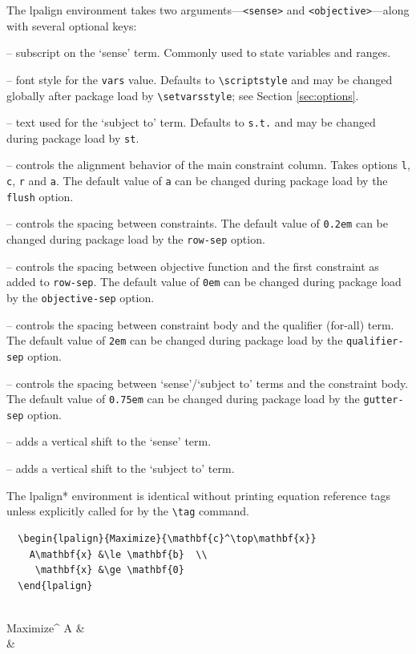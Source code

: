 \documentclass{article}
\begin{document}
The \textsf{lpalign} environment takes two arguments---\verb|<sense>| and \verb|<objective>|---along with several optional keys:\Vtrg
  \begin{compactitem}
  \item[\Verb|vars|] -- subscript on the `sense' term. Commonly used to state variables and ranges.
  \item[\Verb|vars-style|] -- font style for the \verb|vars| value. Defaults to \verb|\scriptstyle| and may be changed globally after package load by \verb|\setvarsstyle|; see Section \ref{sec:options}.
  \item[\Verb|st|] -- text used for the `subject to' term. Defaults to \verb|s.t.| and may be changed during package load by \verb|st|.
  \item[\Verb|flush|] -- controls the alignment behavior of the main constraint column. Takes options \verb|l|, \verb|c|, \verb|r| and \verb|a|. The default value of \verb|a| can be changed during package load by the \verb|flush| option.
  \item[\Verb|row-sep|] -- controls the spacing between constraints. The default value of \verb|0.2em| can be changed during package load by the \verb|row-sep| option.
  \item[\Verb|objective-sep|] -- controls the spacing between objective function and the first constraint as added to \verb|row-sep|. The default value of \verb|0em| can be changed during package load by the \verb|objective-sep| option.
  \item[\Verb|qualifier-sep|] -- controls the spacing between constraint body and the qualifier (for-all) term. The default value of \verb|2em| can be changed during package load by the \verb|qualifier-sep| option.
  \item[\Verb|gutter-sep|] -- controls the spacing between `sense'/`subject to' terms and the constraint body. The default value of \verb|0.75em| can be changed during package load by the \verb|gutter-sep| option.
  \item[\Verb|sense-shift|] -- adds a vertical shift to the `sense' term.
  \item[\Verb|st-shift|] -- adds a vertical shift to the `subject to' term.
  \end{compactitem}
The \textsf{lpalign*} environment is identical without printing equation reference tags unless explicitly called for by the \verb|\tag| command.
\begin{tcolorbox}
  \begin{Verbatim}
  \begin{lpalign}{Maximize}{\mathbf{c}^\top\mathbf{x}}
    A\mathbf{x} &\le \mathbf{b}  \\
     \mathbf{x} &\ge \mathbf{0} 
  \end{lpalign} 
  
  \end{Verbatim}
\tcblower
    \begin{lpalign}{Maximize}{^\top{}}
      A &\le {}  \\
        &\ge {} 
    \end{lpalign}
\end{tcolorbox}
\end{document}
